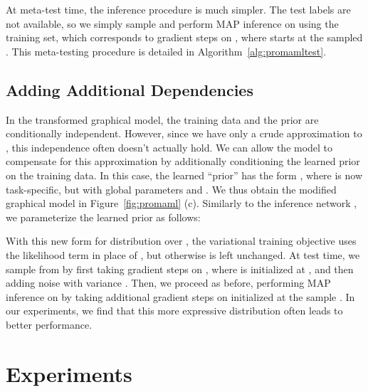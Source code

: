 \documentclass{article}
\begin{document}
At meta-test time, the inference procedure is much simpler. The test labels are not available, so we simply sample  and perform MAP inference on  using the training set, which corresponds to gradient steps on , where  starts at the sampled . This meta-testing procedure is detailed in Algorithm~\ref{alg:promamltest}.




\vspace{-0.3cm}
\subsection{Adding Additional Dependencies}
\vspace{-0.2cm}

In the transformed graphical model, the training data  and the prior  are conditionally independent. However, since we have only a crude approximation to , this independence often doesn't actually hold. We can allow the model to compensate for this approximation by additionally conditioning the learned prior  on the training data. In this case, the learned ``prior'' has the form , where  is now task-specific, but with global parameters  and . We thus obtain the modified graphical model in Figure~\ref{fig:promaml} (c). Similarly to the inference network , we parameterize the learned prior as follows:


With this new form for distribution over , the variational training objective uses the likelihood term  in place of , but otherwise is left unchanged. At test time, we sample from  by first taking gradient steps on , where  is initialized at , and then adding noise with variance . Then, we proceed as before, performing MAP inference on  by taking additional gradient steps on  initialized at the sample .
In our experiments, we find that this more expressive distribution often leads to better performance.



 
\vspace{-0.4cm}
\section{Experiments}
\label{sec:experiments}
\vspace{-0.3cm}
\end{document}
